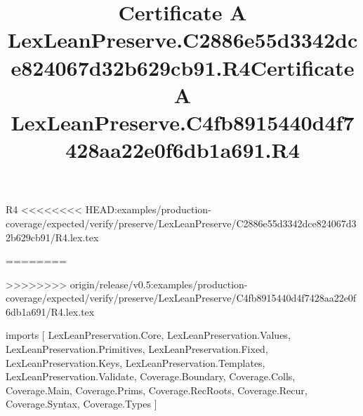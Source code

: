 \begin{lexlean}{R4}
<<<<<<<< HEAD:examples/production-coverage/expected/verify/preserve/LexLeanPreserve/C2886e55d3342dce824067d32b629cb91/R4.lex.tex
\title{Certificate A LexLeanPreserve.C2886e55d3342dce824067d32b629cb91.R4}
========
\title{Certificate A LexLeanPreserve.C4fb8915440d4f7428aa22e0f6db1a691.R4}
>>>>>>>> origin/release/v0.5:examples/production-coverage/expected/verify/preserve/LexLeanPreserve/C4fb8915440d4f7428aa22e0f6db1a691/R4.lex.tex
\begin{coremodule}
imports [
  LexLeanPreservation.Core,
  LexLeanPreservation.Values,
  LexLeanPreservation.Primitives,
  LexLeanPreservation.Fixed,
  LexLeanPreservation.Keys,
  LexLeanPreservation.Templates,
  LexLeanPreservation.Validate,
  Coverage.Boundary,
  Coverage.Colls,
  Coverage.Main,
  Coverage.Prims,
  Coverage.RecRoots,
  Coverage.Recur,
  Coverage.Syntax,
  Coverage.Types
]


\end{coremodule}
\end{lexlean}
